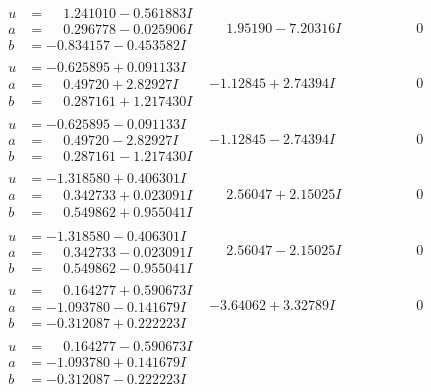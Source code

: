 \documentclass[1p]{elsarticle_modified}
\theoremstyle{definition}
\begin{document}
$$\begin{array}{c|c|c}
\begin{aligned}
u &= \phantom{-}1.241010 - 0.561883 I \\
a &= \phantom{-}0.296778 - 0.025906 I \\
b &= -0.834157 - 0.453582 I\end{aligned}
 & \phantom{-}1.95190 - 7.20316 I & \phantom{-0.000000 } 0 \\ \hline\begin{aligned}
u &= -0.625895 + 0.091133 I \\
a &= \phantom{-}0.49720 + 2.82927 I \\
b &= \phantom{-}0.287161 + 1.217430 I\end{aligned}
 & -1.12845 + 2.74394 I & \phantom{-0.000000 } 0 \\ \hline\begin{aligned}
u &= -0.625895 - 0.091133 I \\
a &= \phantom{-}0.49720 - 2.82927 I \\
b &= \phantom{-}0.287161 - 1.217430 I\end{aligned}
 & -1.12845 - 2.74394 I & \phantom{-0.000000 } 0 \\ \hline\begin{aligned}
u &= -1.318580 + 0.406301 I \\
a &= \phantom{-}0.342733 + 0.023091 I \\
b &= \phantom{-}0.549862 + 0.955041 I\end{aligned}
 & \phantom{-}2.56047 + 2.15025 I & \phantom{-0.000000 } 0 \\ \hline\begin{aligned}
u &= -1.318580 - 0.406301 I \\
a &= \phantom{-}0.342733 - 0.023091 I \\
b &= \phantom{-}0.549862 - 0.955041 I\end{aligned}
 & \phantom{-}2.56047 - 2.15025 I & \phantom{-0.000000 } 0 \\ \hline\begin{aligned}
u &= \phantom{-}0.164277 + 0.590673 I \\
a &= -1.093780 - 0.141679 I \\
b &= -0.312087 + 0.222223 I\end{aligned}
 & -3.64062 + 3.32789 I & \phantom{-0.000000 } 0 \\ \hline\begin{aligned}
u &= \phantom{-}0.164277 - 0.590673 I \\
a &= -1.093780 + 0.141679 I \\
b &= -0.312087 - 0.222223 I\end{aligned}

\end{array}$$
\end{document}
